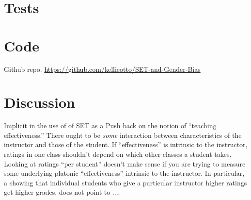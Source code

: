 \documentclass[12pt]{article}
\newcommand{\todo}[1]{{\color{red}{TO DO: \sc #1}}}
\begin{document}


\section{Tests}

\section{Code}
Github repo. \url{https://github.com/kellieotto/SET-and-Gender-Bias}

\section{Discussion}
Implicit in the use of of SET as a 
Push back on the notion of ``teaching effectiveness.''
There ought to be \emph{some} interaction between characteristics of the
instructor and those of the student.
If ``effectiveness'' is intrinsic to the instructor, ratings in one class shouldn't depend on
which other classes a student takes.
Looking at ratings ``per student'' doesn't make sense if you are trying to
measure some underlying platonic ``effectiveness'' intrinsic to the instructor.
In particular,  a showing that individual students who give a particular instructor higher ratings
get higher grades, does not point to ....\todo{fix me}
\end{document}
